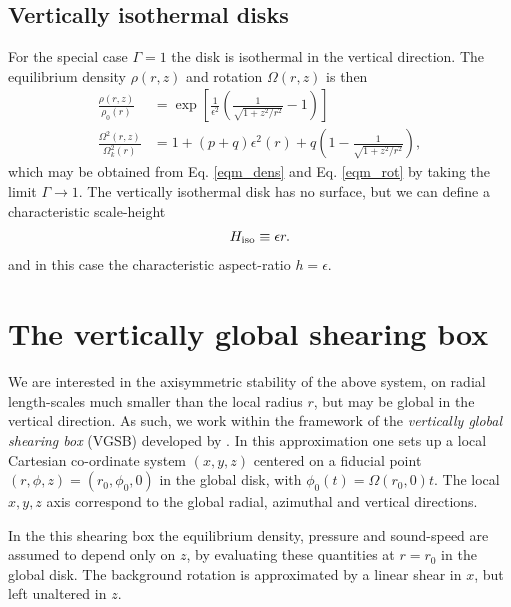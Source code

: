 \subsection{Vertically isothermal disks}
For the special case $\Gamma=1$ the disk is isothermal in the
vertical direction. The equilibrium density $\rho(r,z)$ and rotation
$\Omega(r,z)$ is then 
\begin{align}
  \frac{\rho(r,z)}{\rho_0(r)} &=
  \exp{\left[\frac{1}{\epsilon^2}\left(\frac{1}{\sqrt{1+z^2/r^2}}-1\right)\right]}\\    
  \frac{\Omega^2(r,z)}{\Omega_k^2(r)}& =1+ (p+q)\epsilon^2(r) + q\left(1 -
    \frac{1}{\sqrt{1+z^2/r^2}}\right),\label{vertiso_eqm}
\end{align}
which may be obtained from Eq. \ref{eqm_dens} and Eq. \ref{eqm_rot} by
taking the limit $\Gamma\to 1$. The vertically isothermal disk has no
surface, but we can define a characteristic scale-height 
\begin{align}
  \Hiso \equiv \epsilon r.%
\end{align} 
and in this case the characteristic aspect-ratio $h = \epsilon$. 

\section{The vertically global shearing box} 
We are interested in the axisymmetric stability of the above system,
on radial length-scales much smaller than the local radius $r$, but
may be global in the vertical direction. As such, we work within the
framework of the \emph{vertically global shearing 
  box} (VGSB) developed by \cite{mcnally14}. In this approximation
one sets up a local Cartesian co-ordinate  system $(x,y,z)$ centered
on a fiducial point $(r,\phi,z)=(r_0,\phi_0,0)$ in the global disk, with $\phi_0(t) =
\Omega(r_0,0)t$. The local $x,y,z$ axis correspond to the
global radial, azimuthal and vertical directions.  

In the this shearing box the equilibrium density, pressure and
sound-speed are assumed to depend only on $z$, by evaluating these
quantities at $r=r_0$ in the global disk. The background rotation is
approximated by a linear shear in $x$, but left unaltered in $z$.     

